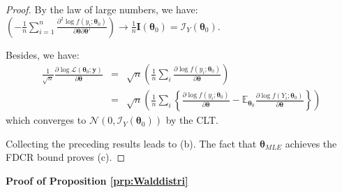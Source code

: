 \documentclass[
  11pt,
]{book}
\theoremstyle{definition}
\theoremstyle{definition}
\theoremstyle{definition}
\theoremstyle{definition}
\theoremstyle{remark}
\begin{document}
\begin{proof}
By the law of large numbers, we have: \(\left(- \frac{1}{n} \sum_{i=1}^n \frac{\partial^2 \log f(y_i;\boldsymbol\theta_0)}{\partial \boldsymbol\theta \partial \boldsymbol\theta'} \right) \overset{}\rightarrow \frac{1}{n} \mathbf{I}(\boldsymbol\theta_0) = \mathcal{I}_Y(\boldsymbol\theta_0)\).

Besides, we have:
\begin{eqnarray*}
\frac{1}{\sqrt{n}} \frac{\partial \log \mathcal{L}(\boldsymbol\theta_0;\mathbf{y})}{\partial \boldsymbol\theta} &=& \sqrt{n} \left( \frac{1}{n} \sum_i \frac{\partial \log f(y_i;\boldsymbol\theta_0)}{\partial \boldsymbol\theta} \right) \\
&=& \sqrt{n} \left( \frac{1}{n} \sum_i \left\{ \frac{\partial \log f(y_i;\boldsymbol\theta_0)}{\partial \boldsymbol\theta} - \mathbb{E}_{\boldsymbol\theta_0} \frac{\partial \log f(Y_i;\boldsymbol\theta_0)}{\partial \boldsymbol\theta} \right\} \right)
\end{eqnarray*}
which converges to \(\mathcal{N}(0,\mathcal{I}_Y(\boldsymbol\theta_0))\) by the CLT.

Collecting the preceding results leads to (b). The fact that \(\boldsymbol\theta_{MLE}\) achieves the FDCR bound proves (c).
\end{proof}

\textbf{Proof of Proposition \ref{prp:Walddistri}}
\end{document}
